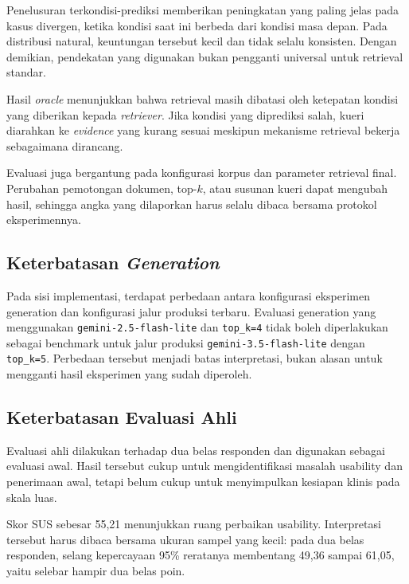 Penelusuran terkondisi-prediksi memberikan peningkatan yang paling jelas pada kasus divergen, ketika kondisi saat ini berbeda dari kondisi masa depan.
Pada distribusi natural, keuntungan tersebut kecil dan tidak selalu konsisten. Dengan demikian, pendekatan yang digunakan bukan pengganti universal untuk
retrieval standar.

Hasil \textit{oracle} menunjukkan bahwa retrieval masih dibatasi oleh ketepatan kondisi yang diberikan kepada \textit{retriever}. Jika kondisi yang diprediksi
salah, kueri diarahkan ke \textit{evidence} yang kurang sesuai meskipun mekanisme retrieval bekerja sebagaimana dirancang.

Evaluasi juga bergantung pada konfigurasi korpus dan parameter retrieval final. Perubahan pemotongan dokumen, top-\(k\), atau susunan kueri dapat mengubah hasil,
sehingga angka yang dilaporkan harus selalu dibaca bersama protokol eksperimennya.

\subsection{Keterbatasan \textit{Generation}}
\label{subsec:bab6-keterbatasan-generation}

Pada sisi implementasi, terdapat perbedaan antara konfigurasi eksperimen generation dan konfigurasi jalur produksi terbaru. Evaluasi generation yang
menggunakan \texttt{gemini-2.5-flash-lite} dan \texttt{top\_k=4} tidak boleh diperlakukan sebagai benchmark untuk jalur produksi \texttt{gemini-3.5-flash-lite}
dengan \texttt{top\_k=5}. Perbedaan tersebut menjadi batas interpretasi, bukan alasan untuk mengganti hasil eksperimen yang sudah diperoleh.

\subsection{Keterbatasan Evaluasi Ahli}
\label{subsec:bab6-keterbatasan-evaluasi-ahli}

Evaluasi ahli dilakukan terhadap dua belas responden dan digunakan sebagai evaluasi awal. Hasil tersebut cukup untuk mengidentifikasi masalah usability
dan penerimaan awal, tetapi belum cukup untuk menyimpulkan kesiapan klinis pada skala luas.

Skor SUS sebesar 55,21 menunjukkan ruang perbaikan usability. Interpretasi tersebut harus dibaca bersama ukuran sampel yang kecil: pada dua belas responden,
selang kepercayaan 95\% reratanya membentang 49,36 sampai 61,05, yaitu selebar hampir dua belas poin.

